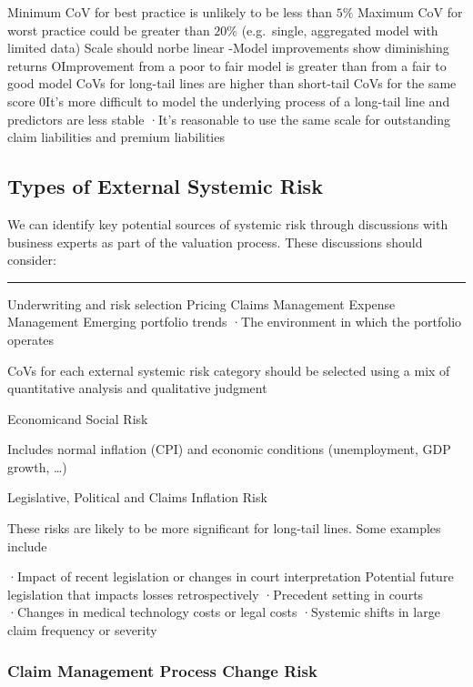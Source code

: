 \documentclass[
]{article}
\begin{document}
Minimum CoV for best practice is unlikely to be less than \(5\%\)
Maximum CoV for worst practice could be greater than \(20\%\)
(e.g.~single, aggregated model with limited data) Scale should norbe
linear -Model improvements show diminishing returns OImprovement from a
poor to fair model is greater than from a fair to good model CoVs for
long-tail lines are higher than short-tail CoVs for the same score 0It's
more difficult to model the underlying process of a long-tail line and
predictors are less stable ·It's reasonable to use the same scale for
outstanding claim liabilities and premium liabilities

\subsection{Types of External Systemic
Risk}\label{types-of-external-systemic-risk}

We can identify key potential sources of systemic risk through
discussions with business experts as part of the valuation process.
These discussions should consider:

\begin{center}\rule{0.5\linewidth}{0.5pt}\end{center}

Underwriting and risk selection Pricing Claims Management Expense
Management Emerging portfolio trends ·The environment in which the
portfolio operates

CoVs for each external systemic risk category should be selected using a
mix of quantitative analysis and qualitative judgment

Economicand Social Risk

Includes normal inflation (CPI) and economic conditions (unemployment,
GDP growth, \ldots)

Legislative, Political and Claims Inflation Risk

These risks are likely to be more significant for long-tail lines. Some
examples include

·Impact of recent legislation or changes in court interpretation
Potential future legislation that impacts losses retrospectively
·Precedent setting in courts ·Changes in medical technology costs or
legal costs ·Systemic shifts in large claim frequency or severity

\subsubsection{Claim Management Process Change
Risk}\label{claim-management-process-change-risk}
\end{document}
